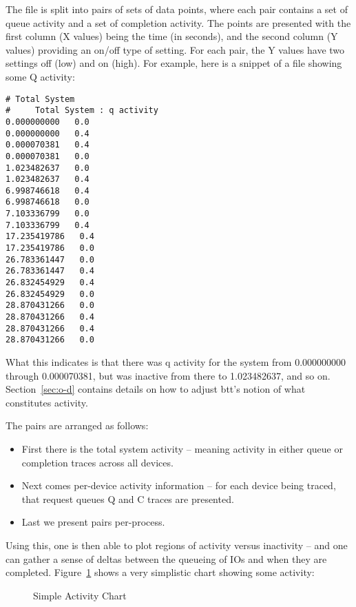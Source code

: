 \documentclass{article}
\begin{document}
  The file is split into pairs of sets of data points, where each pair
  contains a set of queue activity and a set of completion activity. The
  points are presented with the first column (X values) being the time
  (in seconds), and the second column (Y values) providing an on/off
  type of setting. For each pair, the Y values have two settings off
  (low) and on (high). For example, here is a snippet of a file showing
  some Q activity:

\begin{verbatim}
# Total System
#     Total System : q activity
0.000000000   0.0
0.000000000   0.4
0.000070381   0.4
0.000070381   0.0
1.023482637   0.0
1.023482637   0.4
6.998746618   0.4
6.998746618   0.0
7.103336799   0.0
7.103336799   0.4
17.235419786   0.4
17.235419786   0.0
26.783361447   0.0
26.783361447   0.4
26.832454929   0.4
26.832454929   0.0
28.870431266   0.0
28.870431266   0.4
28.870431266   0.4
28.870431266   0.0
\end{verbatim}

  What this indicates is that there was q activity for the system
  from 0.000000000 through 0.000070381, but was inactive from there to
  1.023482637, and so on. Section~\ref{sec:o-d} contains details on how
  to adjust btt's notion of what constitutes activity.

  The pairs are arranged as follows:

  \begin{itemize}
    \item First there is the total system activity -- meaning activity
    in either queue or completion traces across all devices.

    \item Next comes per-device activity information -- for each device
    being traced, that request queues Q and C traces are presented.

    \item Last we present pairs per-process.
  \end{itemize}

  Using this, one is then able to plot regions of activity versus
  inactivity -- and one can gather a sense of deltas between the queueing
  of IOs and when they are completed. Figure~\ref{fig:activity} shows
  a very simplistic chart showing some activity:

  \begin{figure}[hb]
  \leavevmode\centering
  \caption{\label{fig:activity}Simple Activity Chart}
  \end{figure}
\end{document}
